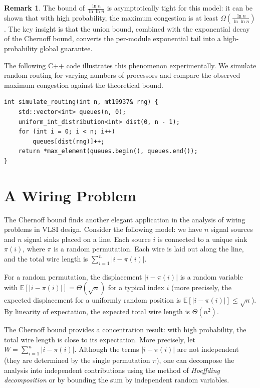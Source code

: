 \documentclass[twoside,12pt]{book}
\theoremstyle{plain}
\theoremstyle{definition}
\newtheorem{remark}[theorem]{Remark}
\theoremstyle{remark}
\newenvironment{cpplisting}{\begin{center}\small}{\end{center}}
\begin{document}
\begin{remark}
The bound of $\frac{\ln n}{\ln \ln n}$ is asymptotically tight for this
model: it can be shown that with high probability, the maximum congestion
is at least $\Omega\!\left(\frac{\ln n}{\ln \ln n}\right)$. The key
insight is that the union bound, combined with the exponential decay of
the Chernoff bound, converts the per-module exponential tail into a
high-probability global guarantee.
\end{remark}

The following C++ code illustrates this phenomenon experimentally.
We simulate random routing for varying numbers of processors and compare
the observed maximum congestion against the theoretical bound.

\begin{cpplisting}
\begin{lstlisting}[caption={Routing simulation (see \texttt{routing.h})}]
int simulate_routing(int n, mt19937& rng) {
    std::vector<int> queues(n, 0);
    uniform_int_distribution<int> dist(0, n - 1);
    for (int i = 0; i < n; i++)
        queues[dist(rng)]++;
    return *max_element(queues.begin(), queues.end());
}
\end{lstlisting}
\end{cpplisting}

\section{A Wiring Problem}
\label{sec:wiring}

The Chernoff bound finds another elegant application in the analysis of
wiring problems in VLSI design. Consider the following model: we have $n$
signal sources and $n$ signal sinks placed on a line. Each source $i$ is
connected to a unique sink $\pi(i)$, where $\pi$ is a random permutation.
Each wire is laid out along the line, and the total wire length is
$\sum_{i=1}^{n} |i - \pi(i)|$.

For a random permutation, the displacement $|i - \pi(i)|$ is a random
variable with $\mathbb{E}[|i - \pi(i)|] = \Theta(\sqrt{n})$ for a
typical index $i$ (more precisely, the expected displacement for a
uniformly random position is $\mathbb{E}[|i - \pi(i)|] \leq \sqrt{n}$).
By linearity of expectation, the expected total wire length is
$\Theta(n^2)$.

The Chernoff bound provides a concentration result: with high probability,
the total wire length is close to its expectation. More precisely, let
$W = \sum_{i=1}^{n} |i - \pi(i)|$. Although the terms $|i - \pi(i)|$ are
not independent (they are determined by the single permutation $\pi$),
one can decompose the analysis into independent contributions using the
method of \emph{Hoeffding decomposition} or by bounding the sum by
independent random variables.
\end{document}
